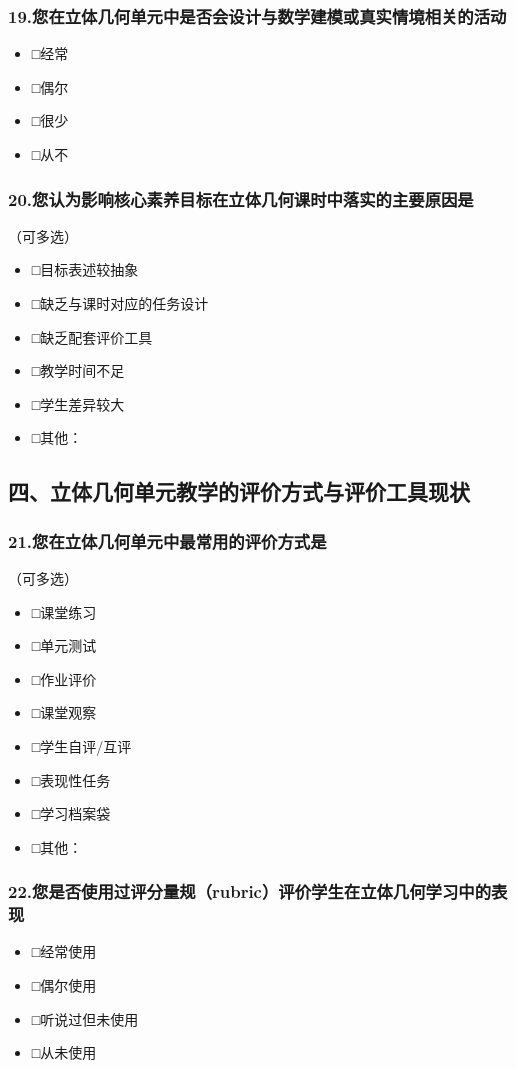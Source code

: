 \documentclass[UTF8,a4paper,12pt,twoside]{ctexart}
\begin{document}
\subsubsection*{19.您在立体几何单元中是否会设计与数学建模或真实情境相关的活动}
\begin{itemize}
\item □经常
\item □偶尔
\item □很少
\item □从不
\end{itemize}

\subsubsection*{20.您认为影响核心素养目标在立体几何课时中落实的主要原因是}
（可多选）
\begin{itemize}
\item □目标表述较抽象
\item □缺乏与课时对应的任务设计
\item □缺乏配套评价工具
\item □教学时间不足
\item □学生差异较大
\item □其他：\underline{\hspace{2cm}}
\end{itemize}

\subsection*{四、立体几何单元教学的评价方式与评价工具现状}

\subsubsection*{21.您在立体几何单元中最常用的评价方式是}
（可多选）
\begin{itemize}
\item □课堂练习
\item □单元测试
\item □作业评价
\item □课堂观察
\item □学生自评/互评
\item □表现性任务
\item □学习档案袋
\item □其他：\underline{\hspace{2cm}}
\end{itemize}

\subsubsection*{22.您是否使用过评分量规（rubric）评价学生在立体几何学习中的表现}
\begin{itemize}
\item □经常使用
\item □偶尔使用
\item □听说过但未使用
\item □从未使用
\end{itemize}
\end{document}
